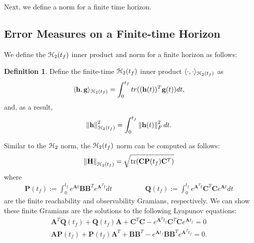 \documentclass[preprint]{elsarticle}
\theoremstyle{definition}
\theoremstyle{definition}
\def\mathcal{\EuScript}
\numberwithin{equation}{section}
\newtheorem{Definition}[Theorem]{Definition}
\newcommand{\A}{\mathbf{A}}
\newcommand{\B}{\mathbf{B}}
\newcommand{\C}{\mathbf{C}}
\newcommand{\HH}{\mathbf{H}}
\newcommand{\PP}{\mathbf{P}}
\newcommand{\Q}{\mathbf{Q}}
\newcommand{\h}{\mathbf{h}}
\newcommand{\g}{\mathbf{g}}
\newcommand{\tf}{t_f}
\newcommand{\ch}{\mathcal{H}}
\newcommand{\norm}[1]{\left\lVert#1\right\rVert}
\begin{document}
Next, we define a norm for a finite time horizon.

\subsection{Error Measures on a Finite-time Horizon}
We define the $\ch_2(\tf)$ inner product and norm for a finite horizon as follows:
\begin{Definition}\label{innerh2}
Define the finite-time $\ch_2(\tf)$ inner product $\langle \cdot, \cdot \rangle_{\ch_2(\tf)}$ as 
\begin{align*}
\langle \h, \g \rangle_{\ch_2(\tf)} =\int_0^{\tf} tr( (\h(t))^T \g(t)) dt, 
\end{align*}
and, as a result, 
\begin{align*}
\norm{\h}_{\ch_2(\tf)}^2=\int_0^{\tf} \norm{\h(t)}_F^2 dt.
\end{align*} 
\end{Definition}

Similar to the $\ch_2$ norm, the $\ch_2(\tf)$ norm can be computed as follows:
\begin{align*}
\norm{\HH}_{\ch_2(\tf)}=\sqrt{\text{tr}(\C \PP(\tf) \C ^T)}
\end{align*}
where
\begin{align*}
 \PP (\tf):= \int_0^{\tf} e^{\A t}\B\B^Te^{\A^Tt} dt \hspace{2cm} \Q (\tf):= \int_0^{\tf}e^{\A^Tt}\C^T\C e^{\A t}dt
\end{align*}
are the finite reachability and observability Gramians, respectively. We can show these finite Gramians are the solutions to the following Lyapunov equations:
\begin{align*}
\A^T\Q (\tf) + \Q(\tf)\A + \C^T\C-e^{\A^T\tf}\C^T\C e^{\A \tf}=0\\
\A\PP(\tf) + \PP(\tf) \A^T+\B\B^T-e^{\A \tf}\B\B^Te^{\A^T\tf}=0.
\end{align*}
\end{document}
